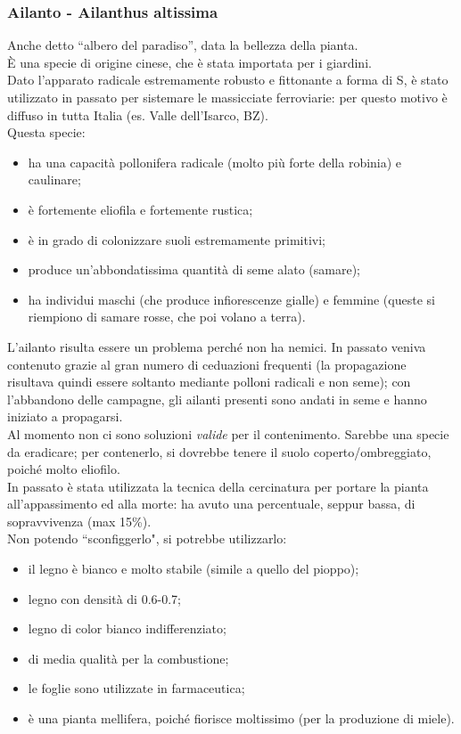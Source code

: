 \subsubsection{Ailanto - Ailanthus altissima}
Anche detto ``albero del paradiso'', data la bellezza della pianta.\\
È una specie di origine cinese, che è stata importata per i giardini.\\
Dato l'apparato radicale estremamente robusto e fittonante a forma di S, è stato utilizzato in passato per sistemare le massicciate ferroviarie: per questo motivo è diffuso in tutta Italia (es. Valle dell'Isarco, BZ).\\
Questa specie: 
\begin{itemize}[nosep]
    \item ha una capacità pollonifera radicale (molto più forte della robinia) e caulinare;
    \item è fortemente eliofila e fortemente rustica;
    \item è in grado di colonizzare suoli estremamente primitivi;
    \item produce un'abbondatissima quantità di seme alato (samare);
    \item ha individui maschi (che produce infiorescenze gialle) e femmine (queste si riempiono di samare rosse, che poi volano a terra).
\end{itemize}
L'ailanto risulta essere un problema perché non ha nemici. In passato veniva contenuto grazie al gran numero di ceduazioni frequenti (la propagazione risultava quindi essere soltanto mediante polloni radicali e non seme); con l'abbandono delle campagne, gli ailanti presenti sono andati in seme e hanno iniziato a propagarsi.\\
Al momento non ci sono soluzioni \textit{valide} per il contenimento. Sarebbe una specie da eradicare; per contenerlo, si dovrebbe tenere il suolo coperto/ombreggiato, poiché molto eliofilo.\\
In passato è stata utilizzata la tecnica della cercinatura per portare la pianta all'appassimento ed alla morte: ha avuto una percentuale, seppur bassa, di sopravvivenza (max 15\%).\\
Non potendo ``sconfiggerlo", si potrebbe utilizzarlo: 
\begin{itemize}[nosep]
    \item il legno è bianco e molto stabile (simile a quello del pioppo);
    \item legno con densità di 0.6-0.7;
    \item legno di color bianco indifferenziato;
    \item di media qualità per la combustione;
    \item le foglie sono utilizzate in farmaceutica;
    \item è una pianta mellifera, poiché fiorisce moltissimo (per la produzione di miele).
\end{itemize}
